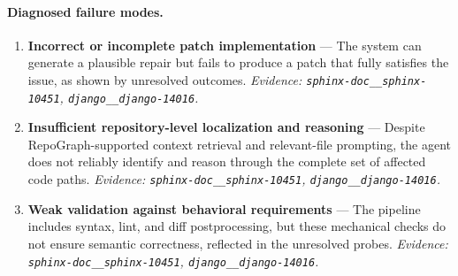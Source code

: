 \paragraph{Diagnosed failure modes.}\begin{enumerate}\itemsep1pt
\item \textbf{Incorrect or incomplete patch implementation} --- The system can generate a plausible repair but fails to produce a patch that fully satisfies the issue, as shown by unresolved outcomes. \emph{Evidence: \texttt{sphinx-doc\_\_sphinx-10451}, \texttt{django\_\_django-14016}.}
\item \textbf{Insufficient repository-level localization and reasoning} --- Despite RepoGraph-supported context retrieval and relevant-file prompting, the agent does not reliably identify and reason through the complete set of affected code paths. \emph{Evidence: \texttt{sphinx-doc\_\_sphinx-10451}, \texttt{django\_\_django-14016}.}
\item \textbf{Weak validation against behavioral requirements} --- The pipeline includes syntax, lint, and diff postprocessing, but these mechanical checks do not ensure semantic correctness, reflected in the unresolved probes. \emph{Evidence: \texttt{sphinx-doc\_\_sphinx-10451}, \texttt{django\_\_django-14016}.}
\end{enumerate}
